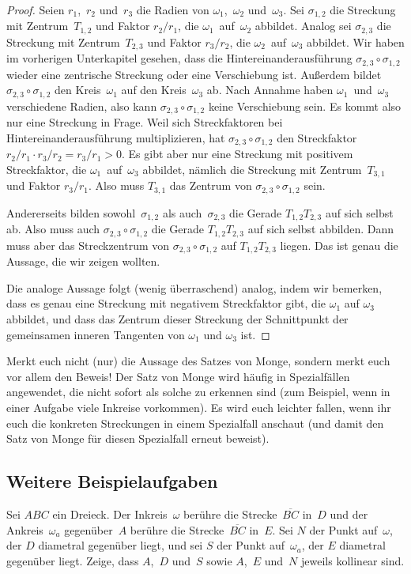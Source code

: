 \begin{proof}
	Seien $r_1$,~$r_2$ und~$r_3$ die Radien von $\omega_1$,~$\omega_2$ und~$\omega_3$. Sei $\sigma_{1,2}$ die Streckung mit Zentrum~$T_{1,2}$ und Faktor $r_2/r_1$, die $\omega_1$~auf~$\omega_2$ abbildet. Analog sei $\sigma_{2,3}$ die Streckung mit Zentrum~$T_{2,3}$ und Faktor $r_3/r_2$, die $\omega_2$~auf~$\omega_3$ abbildet. Wir haben im vorherigen Unterkapitel gesehen, dass die Hintereinanderausführung $\sigma_{2,3}\circ \sigma_{1,2}$ wieder eine zentrische Streckung oder eine Verschiebung ist. Außerdem bildet $\sigma_{2,3}\circ \sigma_{1,2}$ den Kreis~$\omega_1$ auf den Kreis~$\omega_3$ ab. Nach Annahme haben $\omega_1$~und~$\omega_3$ verschiedene Radien, also kann $\sigma_{2,3}\circ \sigma_{1,2}$ keine Verschiebung sein. Es kommt also nur eine Streckung in Frage. Weil sich Streckfaktoren bei Hintereinanderausführung multiplizieren, hat $\sigma_{2,3}\circ \sigma_{1,2}$ den Streckfaktor $r_2/r_1\cdot r_3/r_2=r_3/r_1>0$. Es gibt aber nur eine Streckung mit positivem Streckfaktor, die $\omega_1$~auf~$\omega_3$ abbildet, nämlich die Streckung mit Zentrum~$T_{3,1}$ und Faktor $r_3/r_1$. Also muss $T_{3,1}$ das Zentrum von $\sigma_{2,3}\circ \sigma_{1,2}$ sein.
	
	Andererseits bilden sowohl~$\sigma_{1,2}$ als auch~$\sigma_{2,3}$ die Gerade $T_{1,2}T_{2,3}$ auf sich selbst ab. Also muss auch $\sigma_{2,3}\circ \sigma_{1,2}$ die Gerade $T_{1,2}T_{2,3}$ auf sich selbst abbilden. Dann muss aber das Streckzentrum von $\sigma_{2,3}\circ \sigma_{1,2}$ auf $T_{1,2}T_{2,3}$ liegen. Das ist genau die Aussage, die wir zeigen wollten.
	
	Die analoge Aussage folgt (wenig überraschend) analog, indem wir bemerken, dass es genau eine Streckung mit negativem Streckfaktor gibt, die $\omega_1$ auf $\omega_3$ abbildet, und dass das Zentrum dieser Streckung der Schnittpunkt der gemeinsamen inneren Tangenten von $\omega_1$ und $\omega_3$ ist.
\end{proof}

Merkt euch nicht (nur) die Aussage des Satzes von Monge, sondern merkt euch vor allem den Beweis! Der Satz von Monge wird häufig in Spezialfällen angewendet, die nicht sofort als solche zu erkennen sind (zum Beispiel, wenn in einer Aufgabe viele Inkreise vorkommen). Es wird euch leichter fallen, wenn ihr euch die konkreten Streckungen in einem Spezialfall anschaut (und damit den Satz von Monge für diesen Spezialfall erneut beweist).

\subsection*{Weitere Beispielaufgaben}
\begin{aufgabe*}\label{aufgabe:InAnkreis}
	Sei $ABC$ ein Dreieck. Der Inkreis~$\omega$ berühre die Strecke~$\overline{BC}$ in~$D$ und der Ankreis~$\omega_a$ gegenüber~$A$ berühre die Strecke~$\overline{BC}$ in~$E$. Sei $N$ der Punkt auf~$\omega$, der $D$ diametral gegenüber liegt, und sei $S$ der Punkt auf~$\omega_a$, der $E$ diametral gegenüber liegt. Zeige, dass $A$,~$D$ und~$S$ sowie $A$,~$E$ und~$N$ jeweils kollinear sind.
\end{aufgabe*}

